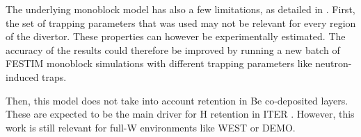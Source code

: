 The underlying monoblock model has also a few limitations, as detailed in .
First, the set of trapping parameters that was used may not be relevant for every region of the divertor.
These properties can however be experimentally estimated.
The accuracy of the results could therefore be improved by running a new batch of FESTIM monoblock simulations with different trapping parameters like neutron-induced traps.

Then, this model does not take into account retention in Be co-deposited layers.
These are expected to be the main driver for H retention in ITER .
However, this work is still relevant for full-W environments like WEST or DEMO.
